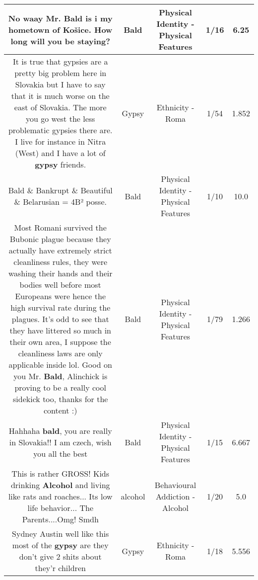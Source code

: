 \documentclass[11pt]{article}
\newlength\mylength
\begin{document}
\begin{center}
\begin{longtable}{|C{.65\mylength}|C{.30\mylength}|C{.12\mylength}|C{.12\mylength}|C{.12\mylength}|}
  \small No waay Mr. \textbf{Bald} is i my hometown of Košice. How long will you be staying?\normalsize   & Bald & Physical Identity - Physical Features & 1/16 & 6.25 \\  \hline
  \small It is true that gypsies are a pretty big problem here in Slovakia but I have to say that it is much worse on the east of Slovakia. The more you go west the less problematic gypsies there are. I live for instance in Nitra (West) and I have a lot of \textbf{gypsy} friends.\normalsize   & Gypsy & Ethnicity - Roma & 1/54 & 1.852 \\  \hline
  \small Bald \& Bankrupt \& Beautiful \& Belarusian = 4B² posse.\normalsize   & Bald & Physical Identity - Physical Features & 1/10 & 10.0 \\  \hline
  \small Most Romani survived the Bubonic plague because they actually have extremely strict cleanliness rules, they were washing their hands and their bodies well before most Europeans were hence the high survival rate during the plagues. It's odd to see that they have littered so much in their own area, I suppose the cleanliness laws are only applicable inside lol. Good on you Mr. \textbf{Bald}, Alinchick is proving to be a really cool sidekick too, thanks for the content :)\normalsize   & Bald & Physical Identity - Physical Features & 1/79 & 1.266 \\  \hline
  \small Hahhaha \textbf{bald}, you are really in Slovakia!! I am czech, wish you all the best\normalsize   & Bald & Physical Identity - Physical Features & 1/15 & 6.667 \\  \hline
  \small This is rather GROSS!  Kids drinking \textbf{Alcohol} and living like rats and roaches... Its low life behavior... The Parents....Omg!  Smdh\normalsize   & alcohol & Behavioural Addiction - Alcohol & 1/20 & 5.0 \\  \hline
  \small Sydney Austin well like this most of the \textbf{gypsy} are they don't give 2 shits about they'r children\normalsize   & Gypsy & Ethnicity - Roma & 1/18 & 5.556 \\  \hline

\end{longtable}
\end{center}
\end{document}
